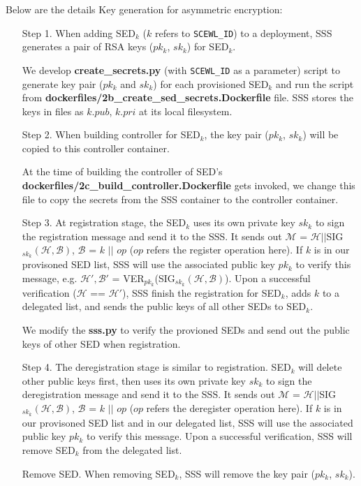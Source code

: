 \documentclass[11pt,oneside,onecolumn,letterpaper]{article}
\begin{document}
Below are the details Key generation for asymmetric encryption:
\begin{itemize}
  \item[Step 1.] When adding SED$_k$ ($k$ refers to \verb|SCEWL_ID|) to a deployment, SSS generates a pair of RSA keys ($pk_k$, $sk_k$) for SED$_k$.
  
  We develop \textbf{create\_secrets.py} (with \verb|SCEWL_ID| as a parameter) script to generate key pair ($pk_k$ and $sk_k$) for each provisioned SED$_k$ and run the script from  \textbf{dockerfiles/2b\_create\_sed\_secrets.Dockerfile} file.
  SSS stores the keys in files as $k.pub$, $k.pri$ at its local filesystem.

  \item[Step 2.] When building controller for SED$_k$, the key pair ($pk_k$, $sk_k$) will be copied to this controller container.
  
  At the time of building the controller of SED's \textbf{dockerfiles/2c\_build\_controller.Dockerfile}  gets invoked, we change this file to copy the secrets from the SSS container to the controller container.

  \item[Step 3.] At registration stage, the SED$_k$ uses its own private key $sk_k$ to sign the registration message and send it to the SSS.
  It sends out $\mathcal{M}$ = $\mathcal{H} || $SIG$_{sk_k}(\mathcal{H}, \mathcal{B})$, $\mathcal{B}$ = $k$ $||$ $op$ ($op$ refers the register operation here).
  If $k$ is in our provisoned SED list, SSS will use the associated public key $pk_k$ to verify this message, e.g. $\mathcal{H'}, \mathcal{B'}$ = VER$_{pk_k}$(SIG$_{sk_k}(\mathcal{H}, \mathcal{B})$).
  Upon a successful verification ($\mathcal{H}$ == $\mathcal{H'}$), SSS finish the registration for SED$_k$, adds $k$ to a delegated list, and sends the public keys of all other SEDs to SED$_k$.
  
  We modify the \textbf{sss.py} to verify the provioned SEDs and send out the public keys of other SED when registration.

  \item[Step 4.] The deregistration stage is similar to registration.
  SED$_k$ will delete other public keys first, then uses its own private key $sk_k$ to sign the deregistration message and send it to the SSS.
  It sends out $\mathcal{M}$ = $\mathcal{H} || $SIG$_{sk_k}(\mathcal{H}, \mathcal{B})$, $\mathcal{B}$ = $k$ $||$ $op$ ($op$ refers the deregister operation here).
  If $k$ is in our provisoned SED list and in our delegated list, SSS will use the associated public key $pk_k$ to verify this message.
  Upon a successful verification, SSS will remove SED$_k$ from the delegated list.

  \item[Remove SED.] When removing SED$_k$, SSS will remove the key pair ($pk_k$, $sk_k$).
\end{itemize}
\end{document}
